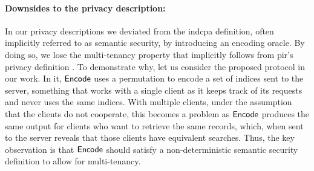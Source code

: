 \paragraph*{Downsides to the privacy description:} In our privacy descriptions we deviated from the \acrshort{indcpa} definition, often implicitly referred to as semantic security, by introducing an encoding oracle. By doing so, we lose the multi-tenancy property that implicitly follows from \acrshort{pir}'s privacy definition \cite{CCS:Henry17}. To demonstrate why, let us consider the proposed protocol in our work. In it, $ \mathsf{{Encode}} $ uses a permutation to encode a set of indices sent to the server, something that works with a single client as it keeps track of its requests and never uses the same indices. With multiple clients, under the assumption that the clients do not cooperate, this becomes a problem as $ \mathsf{{Encode}} $ produces the same output for clients who want to retrieve the same records, which, when sent to the server reveals that those clients have equivalent searches. Thus, the key observation is that $ \mathsf{{Encode}} $ should satisfy a non-deterministic semantic security definition to allow for multi-tenancy.
